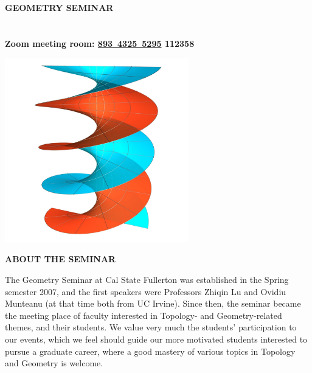 \documentclass[a4paper]{article}
\begin{document}
\thispagestyle{empty}


\newcommand{\name}[1]{\textit{#1}}

\raggedbottom
\begin{minipage}{0.95\textwidth}
\sffamily
\centering
\LARGE{\color{csecondary}\bf GEOMETRY SEMINAR}\\

\Large{\color{cprimary}\textbf{}}\\

\large{\color{cprimary}\textbf{}}\\
\smallskip
\large{\color{cprimary}\textbf{{\color{csecondary}Zoom meeting room:} \href{https://fullerton.zoom.us/j/89343255295?pwd=ZFR3VThaM29ZYkdReGVQS0daS1pHUT09}{893\ 4325\ 5295} 112358}}

\bigskip

\begin{minipage}[b]{0.47\textwidth}
\normalsize
\includegraphics[width=\linewidth,height=3.15in]{helicoid.jpg}
\medskip
\medskip

{\large\raggedright
{\textbf{\color{csecondary}ABOUT THE SEMINAR}}\par
}
\normalsize
\smallskip

The Geometry Seminar at Cal State Fullerton was established in the Spring semester 2007, and the first speakers
were Professors Zhiqin Lu and Ovidiu Munteanu (at that time both from UC Irvine). Since then, the seminar
became the meeting place of faculty interested in Topology- and Geometry-related themes, and their students. We
value very much the students' participation to our events, which we feel should guide our more motivated students
interested to pursue a graduate career, where a good mastery of various topics in Topology and Geometry is
welcome.
\medskip


\end{minipage}
\end{minipage}
\end{document}
